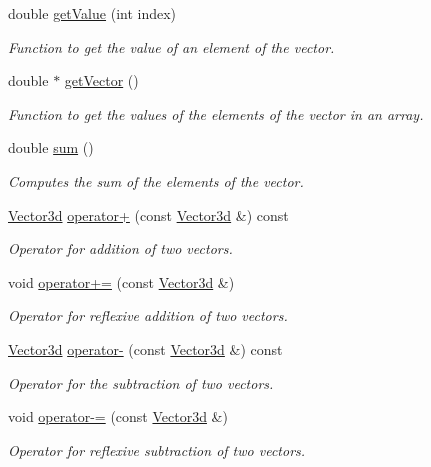 \begin{DoxyCompactItemize}
double \hyperlink{classVector3d_a37055dde72eed6770cf3b2b11b56f0f8}{get\-Value} (int index)
\begin{DoxyCompactList}\small\item\em \-Function to get the value of an element of the vector. \end{DoxyCompactList}\item 
double $\ast$ \hyperlink{classVector3d_a12ca89ab46c79eb78fa6b75cad1a3616}{get\-Vector} ()
\begin{DoxyCompactList}\small\item\em \-Function to get the values of the elements of the vector in an array. \end{DoxyCompactList}\item 
double \hyperlink{classVector3d_a76fa7fc5a86ba77a6764eb0d9072e90a}{sum} ()
\begin{DoxyCompactList}\small\item\em \-Computes the sum of the elements of the vector. \end{DoxyCompactList}\item 
\hyperlink{classVector3d}{\-Vector3d} \hyperlink{classVector3d_ad714ad56910f370335c18262dc5cc13a}{operator+} (const \hyperlink{classVector3d}{\-Vector3d} \&) const 
\begin{DoxyCompactList}\small\item\em \-Operator for addition of two vectors. \end{DoxyCompactList}\item 
void \hyperlink{classVector3d_a034e9f847d613c9cba1cb47202b8143a}{operator+=} (const \hyperlink{classVector3d}{\-Vector3d} \&)
\begin{DoxyCompactList}\small\item\em \-Operator for reflexive addition of two vectors. \end{DoxyCompactList}\item 
\hyperlink{classVector3d}{\-Vector3d} \hyperlink{classVector3d_a727932bfb1f230c8f256e10a0d45a8c7}{operator-\/} (const \hyperlink{classVector3d}{\-Vector3d} \&) const 
\begin{DoxyCompactList}\small\item\em \-Operator for the subtraction of two vectors. \end{DoxyCompactList}\item 
void \hyperlink{classVector3d_a14d45e123683a1f1a2ba32d43083fcd7}{operator-\/=} (const \hyperlink{classVector3d}{\-Vector3d} \&)
\begin{DoxyCompactList}\small\item\em \-Operator for reflexive subtraction of two vectors. \end{DoxyCompactList}\item 

\end{DoxyCompactItemize}
